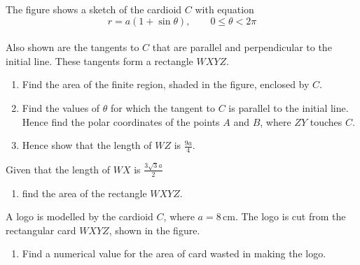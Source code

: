 \documentclass[leqno]{article}
\begin{document}
\begin{enumerate}[
  label=\textbf{\arabic*.},
  leftmargin=*,
  topsep=0pt,
  partopsep=0pt,
  parsep=0pt
]
\begin{figure}[H]
\end{figure}


The figure shows a sketch of the cardioid $C$ with equation
\[
r = a(1 + \sin \theta), \qquad 0 \leq \theta < 2\pi
\]
\\
Also shown are the tangents to $C$ that are parallel and perpendicular to the initial line. These tangents form a rectangle $WXYZ$. \\

\begin{enumerate}[label=\textbf{(\alph*)}]
  \item Find the area of the finite region, shaded in the figure, enclosed by $C$.  \\
  \item Find the values of $\theta$ for which the tangent to $C$ is parallel to the initial line. Hence find the polar coordinates of the points $A$ and $B$, where $ZY$ touches $C$.  \\
  \item Hence show that the length of $WZ$ is $\frac{9a}{4}$.  \\
\end{enumerate}
Given that the length of $WX$ is $\frac{3\sqrt{3}a}{2}$ \\
\begin{enumerate}[label=\textbf{(\alph*)}, resume]
  \item find the area of the rectangle $WXYZ$.  \\
\end{enumerate}
A logo is modelled by the cardioid $C$, where $a = 8\,\mathrm{cm}$. The logo is cut from the rectangular card $WXYZ$, shown in the figure. \\
\begin{enumerate}[label=\textbf{(\alph*)}, resume]
  \item Find a numerical value for the area of card wasted in making the logo.  \\
\end{enumerate}


\end{enumerate}
\end{document}
